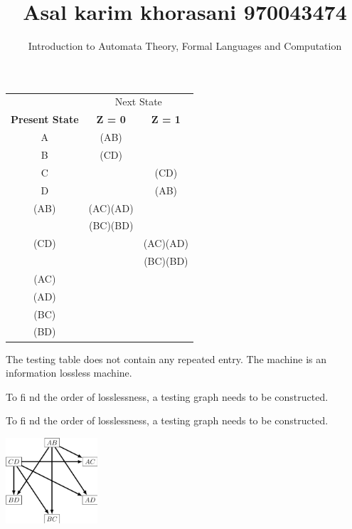\documentclass{beamer}
\title{Asal karim khorasani 970043474}
\author{Introduction to Automata Theory, Formal Languages and Computation}
\date{}
\begin{document}
\begin{frame}
		\maketitle
\end{frame}	
\begin{frame}
	\begin{center}
	\begin{tabular}{ccc}
		\hline
		& \multicolumn{2}{c}{Next State}\\
		\cline{2-3}
		\textbf{Present State } & \textbf{Z = 0} & \textbf{Z = 1}\\
		\hline
		A & (AB) &\\
		B & (CD) &\\
		C & & (CD)\\
		D & & (AB)\\
		(AB) & (AC)(AD)\\
		& (BC)(BD)\\
		(CD) & & (AC)(AD)\\
		& & (BC)(BD)\\
		(AC)\\
		(AD)\\
		(BC)\\
		(BD)\\
		\hline
		
	\end{tabular}
\end{center}

The testing table does not contain any repeated entry. The machine is an information lossless machine.


To ﬁ nd the order of losslessness, a testing graph needs to be constructed.



\end{frame}	
\begin{frame}
	To ﬁ nd the order of losslessness, a testing graph needs to be constructed.
	\begin{center}
		\includegraphics[height=120]{Screenshot .jpg}
	\end{center}
\end{frame}
\end{document}
